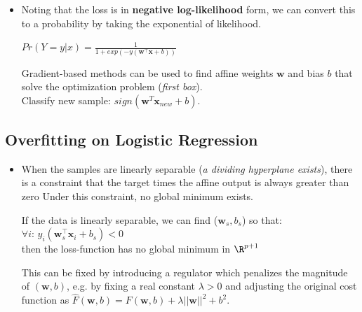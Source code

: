 \documentclass[english]{latex4ei/latex4ei_sheet}
\begin{document}
\begin{sectionbox}
\begin{itemize}
\begin{center}
\end{center}
\item Noting that the loss is in \textbf{negative log-likelihood} form, we can convert this to a probability by taking the exponential of likelihood.
\begin{emphbox}
    \begin{center}
        $Pr(Y=y|x)=\frac{1}{1+exp(-y(\mathbf{w}^{\top}\mathbf{x}+b))}$
    \end{center}
\end{emphbox}
Gradient-based methods can be used to find affine weights $\mathbf{w}$ and bias $b$ that solve the optimization problem (\emph{first box}).\\ Classify new sample: $sign(\mathbf{w}^{T}\mathbf{x}_{new}+b)$.
\end{itemize}

\subsection{Overfitting on Logistic Regression}
\begin{itemize}
\item When the samples are linearly separable (\emph{a dividing hyperplane exists}), there is a constraint that the target times the affine output is always greater than zero Under this constraint, no global minimum exists.
\begin{emphbox}
    If the data is linearly separable, we can find ($\mathbf{w}_s,b_s$) so that: $\forall i:\,y_i(\mathbf{w}_s^{\top}\mathbf{x}_i+b_s)<0$ \\
    then the loss-function has no global minimum in $\R^{p+1}$
\end{emphbox}
This can be fixed by introducing a regulator which penalizes the magnitude of $(\mathbf{w}, b)$, e.g. by fixing a real constant $\lambda>0$ and adjusting the original cost function as  $\hat{F}(\mathbf{w}, b)=F(\mathbf{w}, b)+\lambda||\mathbf{w}||^2+b^2$.
\end{itemize}


\end{sectionbox}
\end{document}
